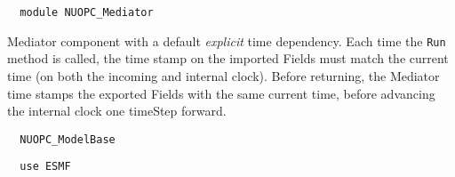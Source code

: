  
\setlength{\parskip}{0pt}
\setlength{\parindent}{0pt}
\setlength{\baselineskip}{11pt}
 
\def\bv{\begin{verbatim}}
\def\ev{\end{verbatim}}
\def\be{\begin{equation}}
\def\ee{\end{equation}}
\def\bea{\begin{eqnarray}}
\def\eea{\end{eqnarray}}
\def\bi{\begin{itemize}}
\def\ei{\end{itemize}}
\def\bn{\begin{enumerate}}
\def\en{\end{enumerate}}
\def\bd{\begin{description}}
\def\ed{\end{description}}
\def\({\left (}
\def\){\right )}
\def\[{\left [}
\def\]{\right ]}
\def\<{\left  \langle}
\def\>{\right \rangle}
\def\cI{{\cal I}}
\def\diag{\mathop{\rm diag}}
\def\tr{\mathop{\rm tr}}


\begin{verbatim}  module NUOPC_Mediator
\end{verbatim}

Mediator component with a default {\em explicit} time dependency. Each time the {\tt Run} method is called, the time stamp on the imported Fields must match the current time (on both the incoming and internal clock). Before returning, the Mediator time stamps the exported Fields with the same current time, before advancing the internal clock one timeStep forward.

\begin{verbatim}  NUOPC_ModelBase
\end{verbatim}

\begin{verbatim}  use ESMF
\end{verbatim}

